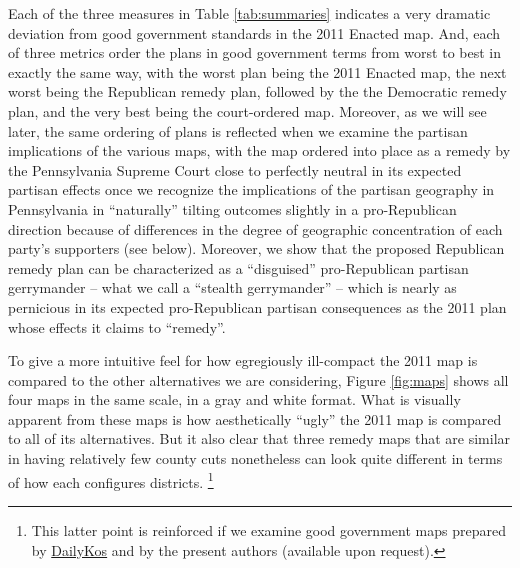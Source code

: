 \par
    Each of the three measures in Table \ref{tab:summaries} indicates a very dramatic deviation from good government standards in the 2011 Enacted map. And, each of three metrics order the plans in good government terms from worst to best in exactly the same way, with the worst plan being the 2011 Enacted map, the next worst being the Republican remedy plan, followed by the the Democratic remedy plan, and the very best being the court-ordered map. Moreover, as we will see later, the same ordering of plans is reflected when we examine the partisan implications of the various maps, with the map ordered into place as a remedy by the Pennsylvania Supreme Court close to perfectly neutral in its expected partisan effects once we recognize the implications of the partisan geography in Pennsylvania in ``naturally'' tilting outcomes slightly in a pro-Republican direction because of differences in the degree of geographic concentration of each party’s supporters (see below). Moreover, we show that the proposed Republican remedy plan can be characterized as a ``disguised'' pro-Republican partisan gerrymander -- what we call a ``stealth gerrymander'' -- which is nearly as pernicious in its expected pro-Republican partisan consequences as the 2011 plan whose effects it claims to ``remedy''.
\par
    To give a more intuitive feel for how egregiously ill-compact the 2011 map is compared to the other alternatives we are considering, Figure \ref{fig:maps} shows all four maps in the same scale, in a gray and white format. What is visually apparent from these maps is how aesthetically ``ugly'' the 2011 map is compared to all of its alternatives. But it also clear that three remedy maps that are similar in having relatively few county cuts nonetheless can look quite different in terms of how each configures districts.
        \footnote{This latter point is reinforced if we examine good government maps prepared by \href{https://www.dailykos.com/stories/2018/2/8/1739648/-Pennsylvania-will-soon-redraw-its-House-map-to-end-GOP-gerrymandering-How-would-you-draw-the-lines}{DailyKos} and by the present authors (available upon request).}
%
%
